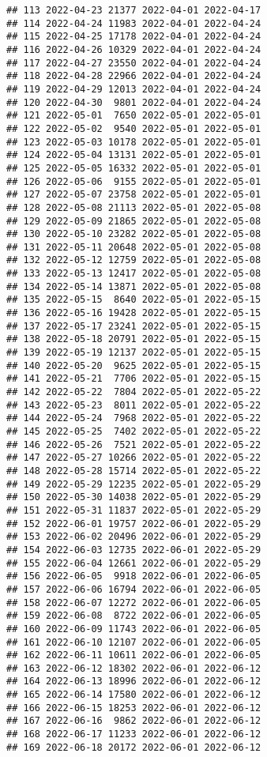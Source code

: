 \documentclass[
]{article}
\begin{document}
\begin{verbatim}
## 113 2022-04-23 21377 2022-04-01 2022-04-17
## 114 2022-04-24 11983 2022-04-01 2022-04-24
## 115 2022-04-25 17178 2022-04-01 2022-04-24
## 116 2022-04-26 10329 2022-04-01 2022-04-24
## 117 2022-04-27 23550 2022-04-01 2022-04-24
## 118 2022-04-28 22966 2022-04-01 2022-04-24
## 119 2022-04-29 12013 2022-04-01 2022-04-24
## 120 2022-04-30  9801 2022-04-01 2022-04-24
## 121 2022-05-01  7650 2022-05-01 2022-05-01
## 122 2022-05-02  9540 2022-05-01 2022-05-01
## 123 2022-05-03 10178 2022-05-01 2022-05-01
## 124 2022-05-04 13131 2022-05-01 2022-05-01
## 125 2022-05-05 16332 2022-05-01 2022-05-01
## 126 2022-05-06  9155 2022-05-01 2022-05-01
## 127 2022-05-07 23758 2022-05-01 2022-05-01
## 128 2022-05-08 21113 2022-05-01 2022-05-08
## 129 2022-05-09 21865 2022-05-01 2022-05-08
## 130 2022-05-10 23282 2022-05-01 2022-05-08
## 131 2022-05-11 20648 2022-05-01 2022-05-08
## 132 2022-05-12 12759 2022-05-01 2022-05-08
## 133 2022-05-13 12417 2022-05-01 2022-05-08
## 134 2022-05-14 13871 2022-05-01 2022-05-08
## 135 2022-05-15  8640 2022-05-01 2022-05-15
## 136 2022-05-16 19428 2022-05-01 2022-05-15
## 137 2022-05-17 23241 2022-05-01 2022-05-15
## 138 2022-05-18 20791 2022-05-01 2022-05-15
## 139 2022-05-19 12137 2022-05-01 2022-05-15
## 140 2022-05-20  9625 2022-05-01 2022-05-15
## 141 2022-05-21  7706 2022-05-01 2022-05-15
## 142 2022-05-22  7804 2022-05-01 2022-05-22
## 143 2022-05-23  8011 2022-05-01 2022-05-22
## 144 2022-05-24  7968 2022-05-01 2022-05-22
## 145 2022-05-25  7402 2022-05-01 2022-05-22
## 146 2022-05-26  7521 2022-05-01 2022-05-22
## 147 2022-05-27 10266 2022-05-01 2022-05-22
## 148 2022-05-28 15714 2022-05-01 2022-05-22
## 149 2022-05-29 12235 2022-05-01 2022-05-29
## 150 2022-05-30 14038 2022-05-01 2022-05-29
## 151 2022-05-31 11837 2022-05-01 2022-05-29
## 152 2022-06-01 19757 2022-06-01 2022-05-29
## 153 2022-06-02 20496 2022-06-01 2022-05-29
## 154 2022-06-03 12735 2022-06-01 2022-05-29
## 155 2022-06-04 12661 2022-06-01 2022-05-29
## 156 2022-06-05  9918 2022-06-01 2022-06-05
## 157 2022-06-06 16794 2022-06-01 2022-06-05
## 158 2022-06-07 12272 2022-06-01 2022-06-05
## 159 2022-06-08  8722 2022-06-01 2022-06-05
## 160 2022-06-09 11743 2022-06-01 2022-06-05
## 161 2022-06-10 12107 2022-06-01 2022-06-05
## 162 2022-06-11 10611 2022-06-01 2022-06-05
## 163 2022-06-12 18302 2022-06-01 2022-06-12
## 164 2022-06-13 18996 2022-06-01 2022-06-12
## 165 2022-06-14 17580 2022-06-01 2022-06-12
## 166 2022-06-15 18253 2022-06-01 2022-06-12
## 167 2022-06-16  9862 2022-06-01 2022-06-12
## 168 2022-06-17 11233 2022-06-01 2022-06-12
## 169 2022-06-18 20172 2022-06-01 2022-06-12

\end{verbatim}
\end{document}
